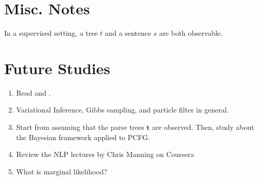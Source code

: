 \documentclass[11pt]{article}
\begin{document}
\section{Misc. Notes}
In a supervised setting, a tree $t$ and a sentence $s$ are both observable.


\section{Future Studies}
\begin{enumerate}
 \item Read \cite{beal2003variational} and \cite{kurihara2004application}.
 \item Variational Inference, Gibbs sampling, and particle filter in general.
 \item Start from assuming that the parse trees $\boldsymbol{t}$ are observed. Then, study about the Bayesian framework applied to PCFG.
 \item Review the NLP lectures by Chris Manning on Coursera
 \item What is marginal likelihood?
\end{enumerate}






\end{document}
